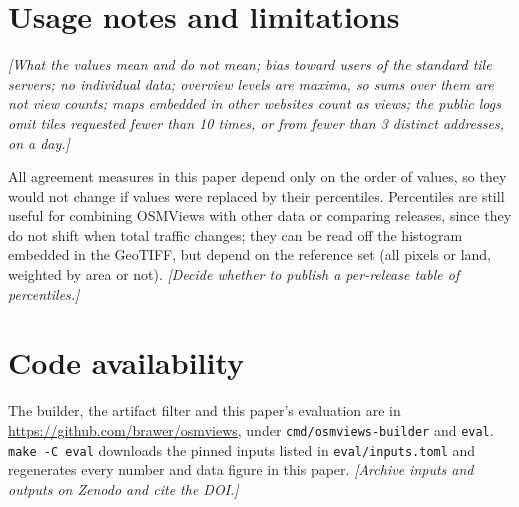 \documentclass[10pt,twocolumn]{article}
\newcommand{\todo}[1]{{\color{red!60!black}\itshape[#1]}}
\newcommand{\code}[1]{\texttt{#1}}
\begin{document}
\begin{table}[t]
  \centering\small
  \caption{Agreement of each ranking function with OSMViews (Kendall's
    $\tau_b$), by sample set.}
  \label{tab:agreement}
  
\end{table}

\begin{table}[t]
  \centering\small
  \caption{Agreement between ranking functions on the ATP brands sample
    set (Kendall's $\tau_b$).}
  \label{tab:matrix}
  
\end{table}

\section{Usage notes and limitations}\label{sec:usage}
\todo{What the values mean and do not mean; bias toward users of the
standard tile servers; no individual data; overview levels are maxima, so
sums over them are not view counts; maps embedded in other websites count
as views; the public logs omit tiles requested fewer than 10 times, or from fewer than 3
distinct addresses, on a day.}

All agreement measures in this paper depend only on the order of values,
so they would not change if values were replaced by their percentiles.
Percentiles are still useful for combining OSMViews with other data or
comparing releases, since they do not shift when total traffic changes;
they can be read off the histogram embedded in the GeoTIFF, but depend on
the reference set (all pixels or land, weighted by area or not).
\todo{Decide whether to publish a per-release table of percentiles.}

\section{Code availability}\label{sec:code}
The builder, the artifact filter and this paper's evaluation are in
\url{https://github.com/brawer/osmviews}, under \code{cmd/osmviews-builder}
and \code{eval}. \code{make -C eval} downloads the pinned inputs listed in
\code{eval/inputs.toml} and regenerates every number and data figure in this
paper. \todo{Archive inputs and outputs on Zenodo and cite the DOI.}
\end{document}
